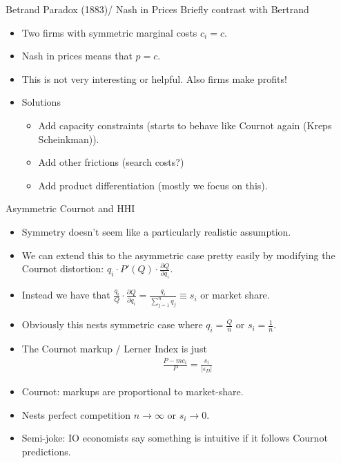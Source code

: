 \documentclass[aspectratio=169,11pt]{beamer}
\begin{document}
\begin{frame}{Betrand Paradox (1883)/ Nash in Prices}
Briefly contrast with Bertrand
\begin{itemize}
\item Two firms with symmetric marginal costs $c_i=c$.
\item Nash in prices means that $p = c$.
\item This is not very interesting or helpful.  Also firms make profits!
\item Solutions

\begin{itemize}
\item Add capacity constraints (starts to behave like Cournot again (Kreps Scheinkman)).
\item Add other frictions (search costs?)
\item Add product differentiation (mostly we focus on this).
\end{itemize}
\end{itemize}
\end{frame}


\begin{frame}{Asymmetric Cournot and HHI}
\begin{itemize}
\item Symmetry doesn't seem like a particularly realistic assumption.
\item We can extend this to the asymmetric case pretty easily by modifying the \alert{Cournot distortion}: $q_i \cdot P'(Q) \cdot \frac{\partial Q}{\partial q_i}$.
\item Instead we have that $\frac{q_i}{Q} \cdot \frac{\partial Q}{\partial q_i} = \frac{q_i}{\sum_{j=1}^n q_j} \equiv s_i$ or \alert{market share}.
\item Obviously this nests symmetric case where $q_i = \frac{Q}{n}$ or $s_i = \frac{1}{n}$.
\item The Cournot markup / Lerner Index is just
\begin{eqnarray*}
\frac{P-mc_i}{P} = \frac{s_i}{|\epsilon_D|}
\end{eqnarray*}
\item Cournot: markups are proportional to market-share.
\item Nests perfect competition $n \rightarrow \infty$ or $s_i \rightarrow 0$.
\item Semi-joke: IO economists say something is \alert{intuitive} if it follows Cournot predictions.
\end{itemize}
\end{frame}
\end{document}
